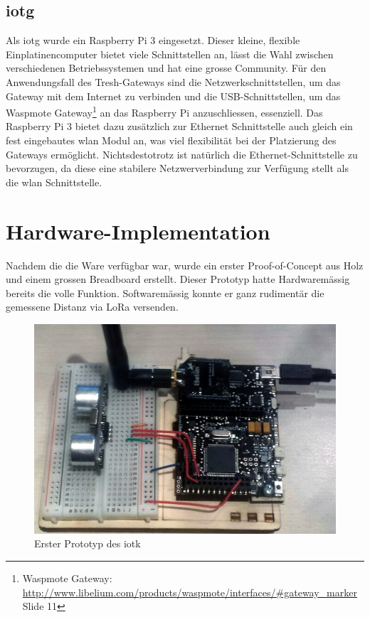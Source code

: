 \subsection{\gls{iotg}}
Als \gls{iotg} wurde ein Raspberry Pi 3 eingesetzt. Dieser kleine, flexible Einplatinencomputer bietet viele Schnittstellen an, lässt die Wahl zwischen verschiedenen Betriebssystemen und hat eine grosse Community. Für den Anwendungsfall des Tresh-Gateways sind die Netzwerkschnittstellen, um das Gateway mit dem Internet zu verbinden und die USB-Schnittstellen, um das Waspmote Gateway\footnote{Waspmote Gateway: \url{http://www.libelium.com/products/waspmote/interfaces/\#gateway_marker} Slide 11} an das Raspberry Pi anzuschliessen, essenziell. Das Raspberry Pi 3 bietet dazu zusätzlich zur Ethernet Schnittstelle auch gleich ein fest eingebautes \gls{wlan} Modul an, was viel flexibilität bei der Platzierung des Gateways ermöglicht. Nichtsdestotrotz ist natürlich die Ethernet-Schnittstelle zu bevorzugen, da diese eine stabilere Netzwerverbindung zur Verfügung stellt als die \gls{wlan} Schnittstelle. 

\section{Hardware-Implementation}
Nachdem die die Ware verfügbar war, wurde ein erster Proof-of-Concept aus Holz und einem grossen Breadboard erstellt. Dieser Prototyp hatte Hardwaremässig bereits die volle Funktion. Softwaremässig konnte er ganz rudimentär die gemessene Distanz via LoRa versenden.

\begin{figure}[H]
     \centering
        \includegraphics[scale=0.6]{pictures/Prototype1.jpg}
    \caption{Erster Prototyp des \gls{iotk}}
    \label{fig:HCSR04}
\end{figure}

